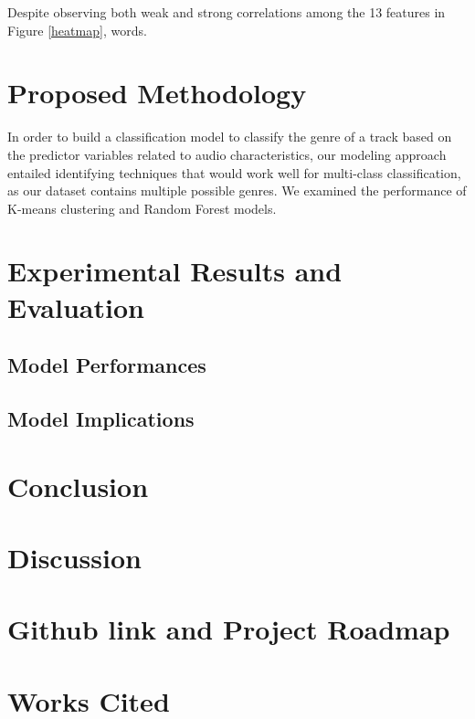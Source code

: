 \documentclass[times, twocolumn]{article}
\begin{document}
Despite observing both weak and strong correlations among the 13 features in Figure \ref{heatmap}, words.

\section{Proposed Methodology}
In order to build a classification model to classify the genre of a track based on the predictor variables related to audio characteristics, our modeling approach entailed identifying techniques that would work well for multi-class classification, as our dataset contains multiple possible genres. We examined the performance of K-means clustering and Random Forest models.

\section{Experimental Results and Evaluation}
\subsection{Model Performances}

\subsection{Model Implications}

\section{Conclusion}

\section{Discussion}

\section{Github link and Project Roadmap}

\section{Works Cited}
\printbibliography
\end{document}
